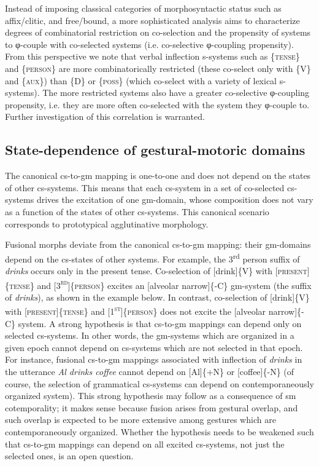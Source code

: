   Instead of imposing classical categories of morphosyntactic status such as affix/clitic, and free/bound, a more sophisticated analysis aims to characterize degrees of combinatorial restriction on co-selection and the propensity of systems to φ-couple with co-selected systems (i.e. co-selective φ-coupling propensity). From this perspective we note that verbal inflection s-systems such as \{\textsc{tense}\} and \{\textsc{person}\} are more combinatorically restricted (these co-select only with \{V\} and \{\textsc{aux}\}) than \{D\} or \{\textsc{poss}\} (which co-select with a variety of lexical s-systems). The more restricted systems also have a greater co-selective φ-coupling propensity, i.e. they are more often co-selected with the system they φ-couple to. Further investigation of this correlation is warranted.

\subsection{State-dependence of gestural-motoric domains}

The canonical cs-to-gm mapping is one-to-one and does not depend on the states of other cs-systems. This means that each cs-system in a set of co-selected cs-systems drives the excitation of one gm-domain, whose composition does not vary as a function of the states of other cs-systems. This canonical scenario corresponds to prototypical agglutinative morphology. 

  Fusional morphs deviate from the canonical cs-to-gm mapping: their gm-domains depend on the cs-states of other systems. For example, the 3\textsuperscript{rd} person suffix of \textit{drinks} occurs only in the present tense. Co-selection of [drink]\{V\} with [\textsc{present}]\{\textsc{tense}\} and [\textsc{3}\textsc{\textsuperscript{rd}}]\{\textsc{person}\} excites an [alveolar narrow]\{-C\} gm-system (the suffix of \textit{drinks}), as shown in the example below. In contrast, co-selection of [drink]\{V\} with [\textsc{present]}\{\textsc{tense}\} and [\textsc{1}\textsc{\textsuperscript{st}}]\{\textsc{person}\} does not excite the [alveolar narrow]\{-C\} system. A strong hypothesis is that cs-to-gm mappings can depend only on selected cs-systems. In other words, the gm-systems which are organized in a given epoch cannot depend on cs-systems which are not selected in that epoch. For instance, fusional cs-to-gm mappings associated with inflection of \textit{drinks} in the utterance \textit{Al drinks coffee} cannot depend on [Al]\{+N\} or [coffee]\{-N\} (of course, the selection of grammatical cs-systems can depend on contemporaneously organized system). This strong hypothesis may follow as a consequence of sm cotemporality; it makes sense because fusion arises from gestural overlap, and such overlap is expected to be more extensive among gestures which are contemporaneously organized. Whether the hypothesis needs to be weakened such that cs-to-gm mappings can depend on all excited cs-systems, not just the selected ones, is an open question.

